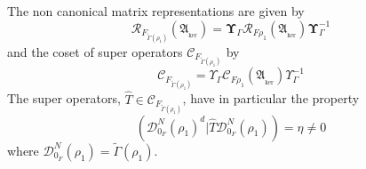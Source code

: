 \documentclass[aps,preprint]{revtex4}%
\begin{document}
The non canonical matrix representations are given by
\begin{equation}
\mathcal{R}_{F_{\tilde{\Gamma}\left(  \rho_{1}\right)  }}\left(
\mathfrak{A}_{_{\ker}}\right)  =\mathbf{\Upsilon}_{\Gamma}\mathcal{R}%
_{F\rho_{1}}\left(  \mathfrak{A}_{_{\ker}}\right)  \mathbf{\Upsilon}_{\Gamma
}^{-1}%
\end{equation}
and the coset of super operators $\mathcal{C}_{F_{\tilde{\Gamma}\left(
\rho_{1}\right)  }}$ by
\begin{equation}
\mathcal{C}_{F_{\tilde{\Gamma}\left(  \rho_{1}\right)  }}=\Upsilon_{\Gamma
}\mathcal{C}_{F\rho_{1}}\left(  \mathfrak{A}_{_{\ker}}\right)  \Upsilon
_{\Gamma}^{-1}%
\end{equation}
The super operators, $\hat{T}\in\mathcal{C}_{F_{\tilde{\Gamma}\left(  \rho
_{1}\right)  }}$, have in particular the property
\begin{equation}
\left(  \mathcal{D}_{0_{F}}^{N}\left(  \rho_{1}\right)  ^{d}|\hat
{T}\mathcal{D}_{0_{F}}^{N}\left(  \rho_{1}\right)  \right)  =\eta\neq0
\end{equation}
where $\mathcal{D}_{0_{F}}^{N}\left(  \rho_{1}\right)  =\tilde{\Gamma}\left(
\rho_{1}\right)  $.
\end{document}
